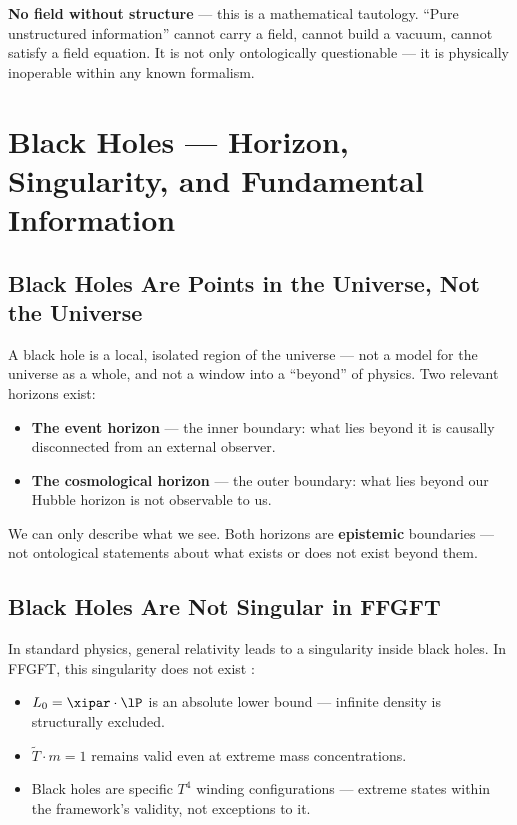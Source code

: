 \textbf{No field without structure} --- this is a mathematical tautology. ``Pure unstructured information'' cannot carry a field, cannot build a vacuum, cannot satisfy a field equation. It is not only ontologically questionable --- it is physically inoperable within any known formalism.

\section{Black Holes --- Horizon, Singularity, and Fundamental Information}

\subsection{Black Holes Are Points in the Universe, Not the Universe}

A black hole is a local, isolated region of the universe --- not a model for the universe as a whole, and not a window into a ``beyond'' of physics. Two relevant horizons exist:
\begin{itemize}
  \item \textbf{The event horizon} --- the inner boundary: what lies beyond it is causally disconnected from an external observer.
  \item \textbf{The cosmological horizon} --- the outer boundary: what lies beyond our Hubble horizon is not observable to us.
\end{itemize}

We can only describe what we see. Both horizons are \textbf{epistemic} boundaries --- not ontological statements about what exists or does not exist beyond them.

\subsection{Black Holes Are Not Singular in FFGFT}

In standard physics, general relativity leads to a singularity inside black holes. In FFGFT, this singularity does not exist \cite{Pascher2026}:
\begin{itemize}
  \item $L_0 = \xipar \cdot \lP$ is an absolute lower bound --- infinite density is structurally excluded.
  \item $\tilde{T} \cdot m = 1$ remains valid even at extreme mass concentrations.
  \item Black holes are specific $T^4$ winding configurations --- extreme states within the framework's validity, not exceptions to it.
\end{itemize}

